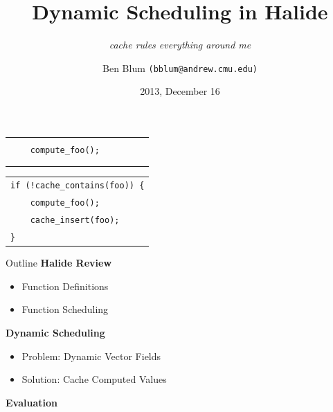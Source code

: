 \documentclass[xcolor=dvipsnames]{beamer}
\title[Dynamic Scheduling in Halide]{{\bf Dynamic Scheduling in Halide}}
\subtitle[]{ {\em cache rules everything around me}}
\author[Ben Blum]{Ben Blum \texttt{(bblum@andrew.cmu.edu)}}
\institute[CMU]{Carnegie Mellon University}
\date[]{2013, December 16}
\begin{document}
\renewcommand{\inserttotalframenumber}{27}
\normalem
\begin{frame}
	\titlepage
\end{frame}


\newcommand\linegap{\vspace{0.2in}}
\newcommand\breakslide[1]{\begin{frame}{} \begin{center} \Large #1 \end{center} \end{frame}}
\newcommand\related[1]{\textsuperscript{\em [#1]}}
\newcommand\hilight[2]{\color{#1}#2\color{black}}

\begin{frame}{}
	\begin{center}
		\begin{tabular}{l}
		\texttt{} \\
		\texttt{~~~~compute\_foo();~~~~~~~~~} \\
		\texttt{} \\
		\texttt{} \\
		\end{tabular}
	\end{center}
\end{frame}

\begin{frame}{}
	\begin{center}
		\begin{tabular}{l}
		\texttt{if (!cache\_contains(foo)) \{} \\
		\texttt{~~~~compute\_foo();} \\
		\texttt{~~~~cache\_insert(foo);} \\
		\texttt{\}} \\
		\end{tabular}
	\end{center}
\end{frame}

\begin{frame}{Outline}
	\textbf{Halide Review}
	\begin{itemize}
		\item Function Definitions
		\item Function Scheduling
	\end{itemize}
	\linegap

	{\bf Dynamic Scheduling}
	\begin{itemize}
		\item Problem: Dynamic Vector Fields
		\item Solution: Cache Computed Values
	\end{itemize}
	\linegap

	{\bf Evaluation}
\end{frame}
\end{document}
